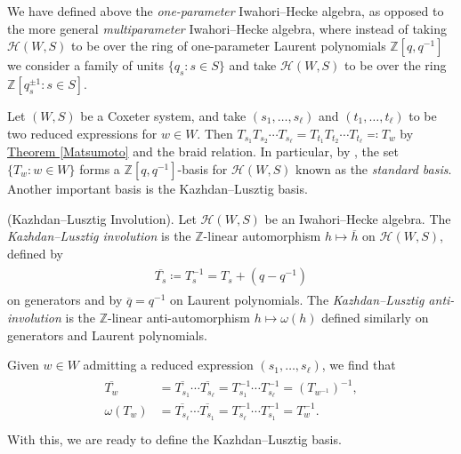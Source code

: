 \noindent\begin{remark} We have defined above the {\em one-parameter} Iwahori--Hecke algebra, as opposed to the more general {\em multiparameter} Iwahori--Hecke algebra, where instead of taking $\mathscr{H}(W, S)$ to be over the ring of one-parameter Laurent polynomials $\mathbb{Z}[q, q^{-1}]$ we consider a family of units $\{q_s : s \in S\}$ and take $\mathscr{H}(W, S)$ to be over the ring $\mathbb{Z}[q_s^{\pm 1} : s \in S]$.\\
\end{remark}

\noindent Let $(W, S)$ be a Coxeter system, and take $(s_1, \dots, s_\ell)$ and $(t_1, \dots, t_\ell)$ to be two reduced expressions for $w \in W$. Then $T_{s_1}T_{s_2}\cdots T_{s_\ell} = T_{t_1}T_{t_2} \cdots T_{t_\ell} \eqqcolon T_w$ by \hyperref[Matsumoto]{Theorem \ref*{Matsumoto}} and the braid relation. In particular, by \cite[Theorem 3.5]{EMTW20}, the set $\{T_w : w \in W\}$ forms a $\mathbb{Z}[q, q^{-1}]$-basis for $\mathscr{H}(W, S)$ known as the {\em standard basis}. Another important basis is the Kazhdan--Lusztig basis.\\

\noindent\begin{definition}\textnormal{(Kazhdan--Lusztig Involution).} Let $\mathscr{H}(W, S)$ be an Iwahori--Hecke algebra. The {\em Kazhdan--Lusztig involution} is the $\mathbb{Z}$-linear automorphism $h \mapsto \overline{h}$ on $\mathscr{H}(W, S)$, defined by
\begin{align*}
\begin{split}
\overline{T_s} \coloneqq T_s^{-1} = T_s + (q - q^{-1})
\end{split}
\end{align*}
\noindent on generators and by $\overline{q} = q^{-1}$ on Laurent polynomials. The {\em Kazhdan--Lusztig anti-involution} is the $\mathbb{Z}$-linear anti-automorphism $h \mapsto \omega(h)$ defined similarly on generators and Laurent polynomials.\\
\end{definition}

\noindent \noindent Given $w \in W$ admitting a reduced expression $(s_1, \dots, s_\ell)$, we find that
\begin{align*}
\begin{split}
\overline{T_w} &= \overline{T_{s_1}}\cdots\overline{T_{s_\ell}} = T_{s_1}^{-1}\cdots T_{s_\ell}^{-1} = (T_{w^{-1}})^{-1},\\
\omega(T_w) &= \overline{T_{s_\ell}}\cdots\overline{T_{s_1}} = T_{s_\ell}^{-1}\cdots T_{s_1}^{-1} = T_w^{-1}.\\
\end{split}
\end{align*}
\noindent With this, we are ready to define the Kazhdan--Lusztig basis.\\

